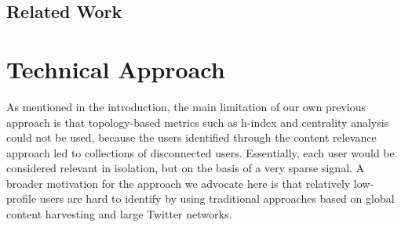 \documentclass[runningheads]{llncs}
\begin{document}
\subsection{Related Work}



\section{Technical Approach}


As mentioned in the introduction, the main limitation of our own previous approach 	\cite{Missier2017,Sousa2018,Barros2018} is that topology-based metrics such as h-index and centrality analysis could not be used, because the users identified through the content relevance approach led to collections of disconnected users. Essentially, each user would be considered relevant in isolation, but on the basis of a very sparse signal.
%
A broader motivation for the approach we advocate here is that relatively low-profile users are hard to identify by using traditional approaches based on global content harvesting and large Twitter networks.
\end{document}
